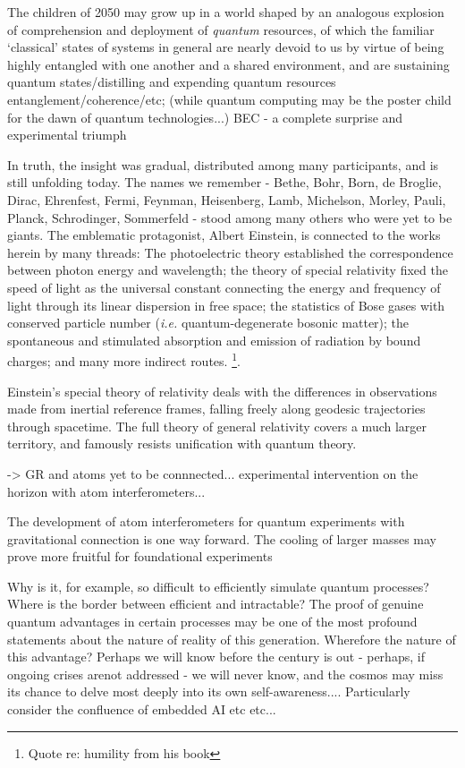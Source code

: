 	The children of 2050 may grow up in a world shaped by an analogous explosion of comprehension and deployment of \emph{quantum} resources, of which the familiar `classical' states of systems in general are nearly devoid to us by virtue of being highly entangled with one another and a shared environment, and are sustaining quantum states/distilling and expending quantum resources entanglement/coherence/etc; (while quantum computing may be the poster child for the dawn of quantum technologies...)
	BEC - a complete surprise and experimental triumph

	In truth, the insight was gradual, distributed among many participants, and is still unfolding today. The names we remember - Bethe, Bohr, Born, de Broglie, Dirac, Ehrenfest, Fermi, Feynman, Heisenberg, Lamb, Michelson, Morley, Pauli, Planck, Schrodinger, Sommerfeld - stood among many others who were yet to be giants. The emblematic protagonist, Albert Einstein, is connected to the works herein by many threads: The photoelectric theory established the correspondence between photon energy and wavelength; the theory of special relativity fixed the speed of light as the universal constant connecting the energy and frequency of light through its linear dispersion in free space; the statistics of Bose gases with conserved particle number (\emph{i.e.} quantum-degenerate bosonic matter); the spontaneous and stimulated absorption and emission of radiation by bound charges; and many more indirect routes. \footnote{Quote re: humility from his book}.

	Einstein's special theory of relativity deals with the differences in observations made from inertial reference frames, falling freely along geodesic trajectories through spacetime. The full theory of general relativity covers a much larger territory, and famously resists unification with quantum theory. 

	-> GR and atoms yet to be connnected... experimental intervention on the horizon with atom interferometers...

	The development of atom interferometers for quantum experiments with gravitational connection is one way forward. The cooling of larger masses may prove more fruitful for foundational experiments

Why is it,
	for example, so difficult to efficiently simulate quantum processes?
	Where is the border between efficient and intractable? The proof of
	genuine quantum advantages in certain processes may be one of the most
	profound statements about the nature of reality of this generation.
	Wherefore the nature of this advantage? Perhaps we will know before the
	century is out - perhaps, if ongoing crises arenot addressed - we will
	never know, and the cosmos may miss its chance to delve most deeply into
	its own self-awareness.... Particularly consider the confluence of embedded AI etc etc...


